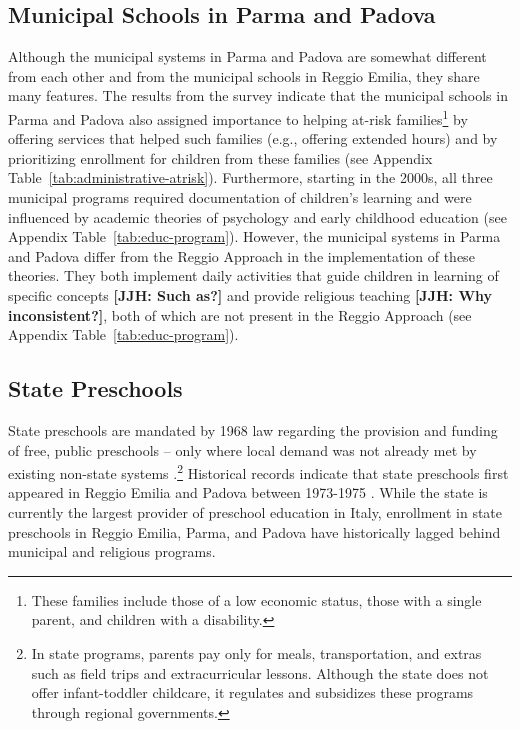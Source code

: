 \subsection{Municipal Schools in Parma and Padova}
Although the municipal systems in Parma and Padova are somewhat different from each other and from the municipal schools in Reggio Emilia, they share many features. The results from the survey indicate that the municipal schools in Parma and Padova also assigned importance to helping at-risk families\footnote{These families include those of a low economic status, those with a single parent, and children with a disability.} by offering services that helped such families (e.g., offering extended hours) and by prioritizing enrollment for children from these families (see Appendix Table~\ref{tab:administrative-atrisk}). Furthermore, starting in the 2000s, all three municipal programs required documentation of children's learning and were influenced by academic theories of psychology and early childhood education (see Appendix Table~\ref{tab:educ-program}). However, the municipal systems in Parma and Padova differ from the Reggio Approach in the implementation of these theories. They both implement daily activities that guide children in learning of specific concepts \textbf{[JJH: Such as?]} and provide religious teaching \textbf{[JJH: Why inconsistent?]}, both of which are not present in the Reggio Approach (see Appendix Table~\ref{tab:educ-program}).


\subsection{State Preschools}
State preschools are mandated by 1968 law regarding the provision and funding of free, public preschools -- only where local demand was not already met by existing non-state systems \citep{Hohnerlein_2009_Paradox-Public-Preschools}.\footnote{In state programs, parents pay only for meals, transportation, and extras such as field trips and extracurricular lessons. Although the state does not offer infant-toddler childcare, it regulates and subsidizes these programs through regional governments.}  Historical records indicate that state preschools first appeared in Reggio Emilia and Padova between 1973-1975 \citep{Padova-Admin-Data_1964-2011,Reggio-Admin-data_1966-2006,Reggio-Annual-Journals_1994-2011}. While the state is currently the largest provider of preschool education in Italy, enrollment in state preschools in Reggio Emilia, Parma, and Padova have historically lagged behind municipal and religious programs.

